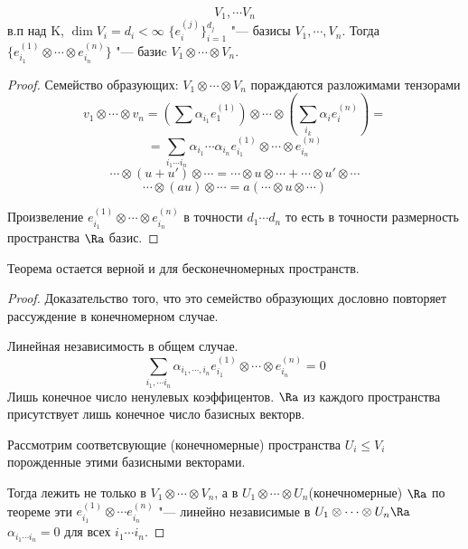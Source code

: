 \begin{theorem}
$$V_1, \cdots V_n$$ в.п над K, $\dim V_i = d_i < \infty$
$\{e_{i}^{(j)}\}_{i = 1}^{d_j}$ "--- базисы $V_1, \cdots, V_n$.
Тогда $\{e_{i_1}^{(1)} \otimes \cdots \otimes e_{i_n}^{(n)}\}$ "--- базиc $V_1 \otimes \cdots \otimes V_n$.
\end{theorem}
\begin{proof}
    Семейство образующих:
    $V_1 \otimes \cdots \otimes V_n$ пораждаются разложимами тензорами 
    $$v_1 \otimes \cdots \otimes v_n = (\sum \alpha_{i_1} e_1^{(1)}) \otimes \cdots \otimes (\sum_{i_k}\alpha_ie_i^{(n)}) =$$
    $$= \sum_{i_1 \cdots i_n}\alpha_{i_1} \cdots \alpha_{i_n} e_{i_1}^{(1)} \otimes\cdots \otimes e_{i_n}^{(n)}$$
    $$\cdots \otimes (u + u') \otimes \cdots = \cdots \otimes u \otimes \cdots + \cdots \otimes u' \otimes \cdots$$
    $$\cdots \otimes (au) \otimes \cdots = a(\cdots \otimes u \otimes \cdots) $$

    Произвеление $e_{i_1}^{(1)} \otimes \cdots \otimes e_{i_n}^{(n)}$ в точности $d_1 \cdots d_n$ то есть 
    в точности размерность пространства $\Ra$ базис. 
\end{proof}
\begin{Rem}
Теорема остается верной и для бесконечномерных пространств. 
\end{Rem}
\begin{proof}
    Доказательство того, что это семейство образующих дословно повторяет рассуждение в конечномерном случае. 

    Линейная независимость в общем случае. 
    $$\sum_{i_1,  \cdots i_n}\alpha_{i_1,\cdots, i_n}e_{i_1}^{(1)} \otimes \cdots \otimes e_{i_n}^{(n)} = 0$$
    Лишь конечное число ненулевых коэффицентов. 
    $\Ra$ из каждого пространства присутствует лишь конечное число базисных векторв. 

    Рассмотрим соответсвующие (конечномерные) пространства $U_i \le V_i$ порожденные этими базисными векторами. 

    Тогда лежить не только в $V_1 \otimes \cdots \otimes V_n$, а в $U_1 \otimes \cdots \otimes U_n$(конечномерные)
    $\Ra$ по теореме эти $e_{i_1}^{(1)} \otimes \cdots e_{i_n}^{(n)}$ "--- линейно независимые в $U_1 \otimes \cdots \otimes U_n \Ra$
    $\alpha_{i_1 \cdots i_n} = 0$ для всех $i_1 \cdots i_n$. 
\end{proof}
